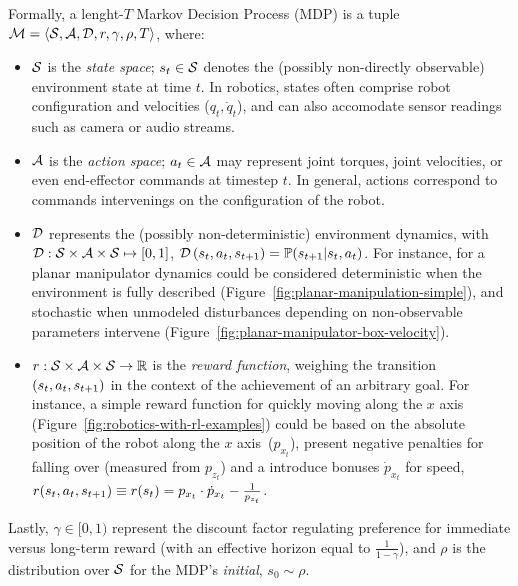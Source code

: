 Formally, a lenght-\(T\) Markov Decision Process (MDP) is a tuple \( \mathcal M = \langle \mathcal S, \mathcal A, \mathcal D, r, \gamma, \rho, T \rangle \), where:
\begin{itemize}
    \item \(\mathcal S\) is the \emph{state space}; \(s_t \in \mathcal S\) denotes the (possibly non-directly observable) environment state at time \(t\). In robotics, states often comprise robot configuration and velocities (\(q_t, \dot q_t\)), and can also accomodate sensor readings such as camera or audio streams.
    \item \(\mathcal A\) is the \emph{action space}; \(a_t \in \mathcal A\) may represent joint torques, joint velocities, or even end-effector commands at timestep \( t \). In general, actions correspond to commands intervenings on the configuration of the robot. 
    \item \(\mathcal D\) represents the (possibly non-deterministic) environment dynamics, with \(\mathcal D: \mathcal S \times \mathcal A \times \mathcal S \mapsto [0, 1] \), \( \mathcal D \, (s_t, a_t, s_{t+1}) = \mathbb P (s_{t+1} \vert s_t, a_t) \). For instance, for a planar manipulator dynamics could be considered deterministic when the environment is fully described (Figure~\ref{fig:planar-manipulation-simple}), and stochastic when unmodeled disturbances depending on non-observable parameters intervene (Figure~\ref{fig:planar-manipulator-box-velocity}).
    \item \(r: \mathcal S \times \mathcal A \times \mathcal S \to \mathbb R\) is the \emph{reward function}, weighing the transition \( (s_t, a_t, s_{t+1}) \) in the context of the achievement of an arbitrary goal. For instance, a simple reward function for quickly moving along the \( x \) axis (Figure~\ref{fig:robotics-with-rl-examples}) could be based on the absolute position of the robot along the \( x \) axis~(\(p_{x_t}\)), present negative penalties for falling over (measured from \( p_{z_t} \)) and a introduce bonuses \( \dot p_{x_t} \) for speed, \(r (s_t, a_t, s_{t+1}) \equiv r(s_t) = p_{x_t} \cdot \dot p_{x_t} - \tfrac{1}{p_{z_t}} \).
\end{itemize}
Lastly, \(\gamma \in [0,1) \) represent the discount factor regulating preference for immediate versus long-term reward (with an effective horizon equal to \( \tfrac{1}{1-\gamma} \)), and \( \rho \) is the distribution over \(\mathcal S \) for the MDP's \emph{initial}, \( s_0 \sim \rho \).

